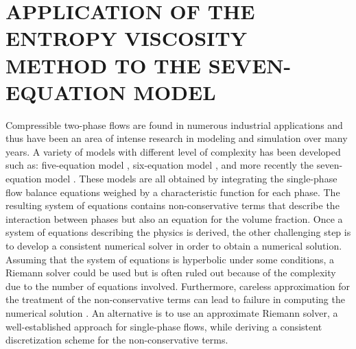 %
%
%


\chapter{\uppercase {Application of the entropy viscosity method to the seven-equation model}}\label{chap:seven}
 
%
Compressible two-phase flows are found in numerous industrial applications and thus have been an area of intense research in modeling and simulation over many years. A variety of models with different level of complexity has been developed such as: five-equation model \cite{Kapila_2001}, six-equation model \cite{Toumi_1996}, and more recently the seven-equation model \cite{SEM}. These models are all obtained by integrating the single-phase flow balance equations weighed by a characteristic function for each phase. The resulting system of equations contains non-conservative terms that describe the interaction between phases but also an equation for the volume fraction. Once a system of equations describing the physics is derived, the other challenging step is to develop a consistent numerical solver in order to obtain a numerical solution. Assuming that the system of equations is hyperbolic under some conditions, a Riemann solver could be used but is often ruled out because of the complexity due to the number of equations involved. Furthermore, careless approximation for the treatment of the non-conservative terms can lead to failure in computing the numerical solution \cite{Abgrall_2002} . An alternative is to use an approximate Riemann solver, a well-established approach for single-phase flows, while deriving a consistent discretization scheme for the non-conservative terms. 

